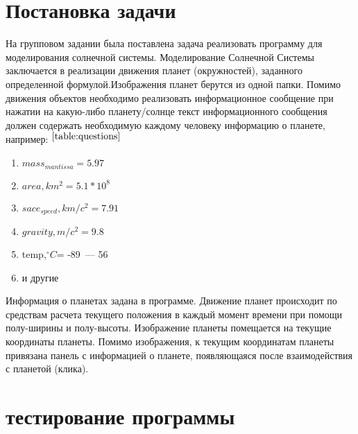\documentclass[a4paper,14pt]{extarticle}
\begin{document}

\newpage\section{Постановка задачи}  
На групповом задании была поставлена задача реализовать программу для моделирования солнечной системы. Моделирование Солнечной Системы заключается в реализации движения планет (окружностей), заданного определенной формулой.Изображения планет берутся из одной папки.
Помимо движения объектов необходимо реализовать информационное сообщение при нажатии на какую-либо планету/солнце текст информационного сообщения должен содержать необходимую каждому человеку информацию о планете, например: $^{\ref{table:questions}}$
\begin{enumerate}

 \item ${mass_{mantissa}}= {5.97}$
 \item ${area, km^2}={5.1*10^8}$
 \item ${sace_{speed},km/c^2}={7.91}$
  \item $gravity, m/c^2={9.8}$
  \item  temp,${{^\circ} C}$= -89~--- 56 
\item и другие
\end{enumerate}
Информация о планетах задана в программе. Движение планет происходит по средствам расчета текущего положения в каждый момент времени при помощи полу-ширины и полу-высоты. Изображение планеты помещается на текущие координаты планеты. Помимо изображения, к текущим координатам планеты привязана панель с информацией о планете, появляющаяся после взаимодействия с планетой (клика).


\newpage\section{тестирование программы}  

\end{document}
